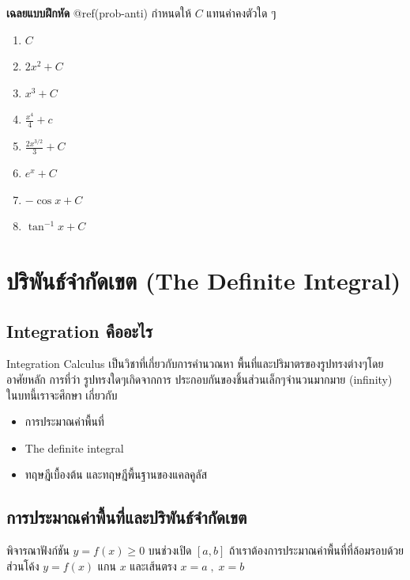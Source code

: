 \documentclass[
]{book}
\begin{document}
\textbf{เฉลยแบบฝึกหัด} @ref(prob-anti) กำหนดให้ \(C\) แทนค่าคงตัวใด ๆ

\begin{enumerate}
\def\labelenumi{\arabic{enumi}.}
\item
  \(C\)
\item
  \(2x^{2} + C\)
\item
  \(x^{3} + C\)
\item
  \(\displaystyle \frac{x^{4}}{4}+c\)
\item
  \(\displaystyle \frac{2x^{3/2}}{3} + C\)
\item
  \(e^{x} + C\)
\item
  \(-\cos x + C\)
\item
  \(\tan^{-1}x + C\)
\end{enumerate}

\section{ปริพันธ์จำกัดเขต (The Definite
Integral)}\label{uxe1buxe23uxe1euxe19uxe18uxe08uxe33uxe01uxe14uxe40uxe02uxe15-the-definite-integral}

\subsection{Integration
คืออะไร}\label{integration-uxe04uxe2duxe2duxe30uxe44uxe23}

Integration Calculus เป็นวิชาที่เกี่ยวกับการคำนวณหา
พื้นที่และปริมาตรของรูปทรงต่างๆโดยอาศัยหลัก การที่ว่า รูปทรงใดๆเกิดจากการ
ประกอบกันของชิ้นส่วนเล็กๆจำนวนมากมาย (infinity) ในบทนี้เราจะศึกษา เกี่ยวกับ

\begin{itemize}
\item
  การประมาณค่าพื้นที่
\item
  The definite integral
\item
  ทฤษฎีเบื้องต้น และทฤษฎีพื้นฐานของแคลคูลัส
\end{itemize}

\subsection{การประมาณค่าพื้นที่และปริพันธ์จำกัดเขต}\label{uxe01uxe32uxe23uxe1buxe23uxe30uxe21uxe32uxe13uxe04uxe32uxe1euxe19uxe17uxe41uxe25uxe30uxe1buxe23uxe1euxe19uxe18uxe08uxe33uxe01uxe14uxe40uxe02uxe15}

พิจารณาฟังก์ชัน \(y=f(x) \ge 0\) บนช่วงเปิด \([a,b]\)
ถ้าเราต้องการประมาณค่าพื้นที่ที่ล้อมรอบด้วยส่วนโค้ง \(y=f(x)\) แกน \(x\) และเส้นตรง
\(x=a\;,\;x=b\)\\
\end{document}
